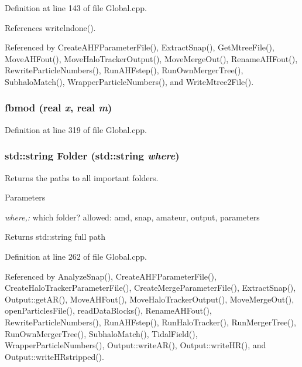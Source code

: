 Definition at line 143 of file Global.cpp.



References writelndone().



Referenced by CreateAHFParameterFile(), ExtractSnap(), GetMtreeFile(), MoveAHFout(), MoveHaloTrackerOutput(), MoveMergeOut(), RenameAHFout(), RewriteParticleNumbers(), RunAHFstep(), RunOwnMergerTree(), SubhaloMatch(), WrapperParticleNumbers(), and WriteMtree2File().

\subsubsection[{fbmod}]{ fbmod ({\bf real} {\em x}, \/  {\bf real} {\em m})}\label{Global_8cpp_a899f0547561b988f5ed4f2ad3e834cbf}


Definition at line 319 of file Global.cpp.

\subsubsection[{Folder}]{\setlength{\rightskip}{0pt plus 5cm}std::string Folder (std::string {\em where})}\label{Global_8cpp_ad3867aaa410297f271cb4a5f443f368c}
Returns the paths to all important folders. 
\begin{DoxyParams}{Parameters}
\item[{\em where,:}]which folder? allowed: amd, snap, amateur, output, parameters \end{DoxyParams}
\begin{DoxyReturn}{Returns}
std::string full path 
\end{DoxyReturn}


Definition at line 262 of file Global.cpp.



Referenced by AnalyzeSnap(), CreateAHFParameterFile(), CreateHaloTrackerParameterFile(), CreateMergeParameterFile(), ExtractSnap(), Output::getAR(), MoveAHFout(), MoveHaloTrackerOutput(), MoveMergeOut(), openParticlesFile(), readDataBlocks(), RenameAHFout(), RewriteParticleNumbers(), RunAHFstep(), RunHaloTracker(), RunMergerTree(), RunOwnMergerTree(), SubhaloMatch(), TidalField(), WrapperParticleNumbers(), Output::writeAR(), Output::writeHR(), and Output::writeHRstripped().

